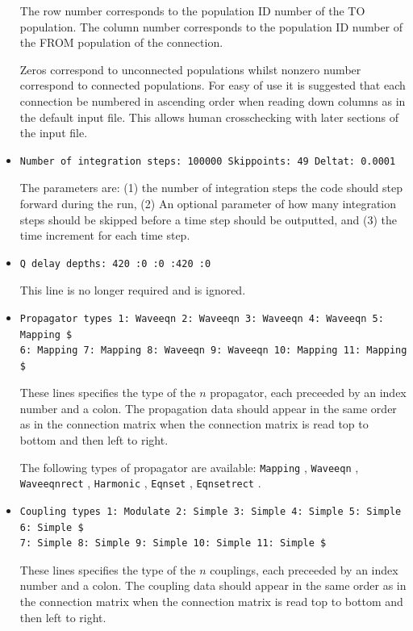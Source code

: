 \documentclass[12pt,a4paper]{article}
\newcommand{\type}[1]{ {\small\small\tt #1} }
\begin{document}
\begin{itemize}
The row number corresponds to the population ID number of the TO population. The column number corresponds to the population ID number of the FROM population of the connection.

Zeros correspond to unconnected populations whilst nonzero number correspond to connected populations. For easy of use it is suggested that each connection be numbered in ascending order when reading down columns as in the default input file. This allows human crosschecking with later sections of the input file.
\item
\begin{lstlisting}
Number of integration steps: 100000 Skippoints: 49 Deltat: 0.0001
\end{lstlisting}
The parameters are: 
(1) the number of integration steps the code should step forward during the run, (2) An optional parameter of how many integration steps should be skipped before a time step should be outputted, and (3) the time increment for each time step.

\item
\begin{lstlisting}
Q delay depths: 420 :0 :0 :420 :0
\end{lstlisting} This line is no longer required 
and is ignored.

\item
\begin{lstlisting}
Propagator types 1: Waveeqn 2: Waveeqn 3: Waveeqn 4: Waveeqn 5: Mapping $
6: Mapping 7: Mapping 8: Waveeqn 9: Waveeqn 10: Mapping 11: Mapping $
\end{lstlisting}
These lines specifies the type of the $n$ propagator, each preceeded by an index number and a colon. The propagation data should appear in the same order as in the connection matrix when the connection matrix is read top to bottom and then left to right.

The following types of propagator are available: \type{Mapping}, \type{Waveeqn},\type{Waveeqnrect}, \type{Harmonic}, \type{Eqnset}, \type{Eqnsetrect}.
\item
\begin{lstlisting}
Coupling types 1: Modulate 2: Simple 3: Simple 4: Simple 5: Simple 6: Simple $ 
7: Simple 8: Simple 9: Simple 10: Simple 11: Simple $
\end{lstlisting}
These lines specifies the type of the $n$ couplings, each preceeded by an index number and a colon. The coupling data should appear in the same order as in the connection matrix when the connection matrix is read top to bottom and then left to right.


\end{itemize}
\end{document}
